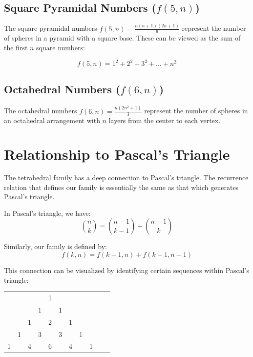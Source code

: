 \documentclass[12pt,a4paper]{article}
\begin{document}
\subsection{Square Pyramidal Numbers ($f(5,n)$)}

The square pyramidal numbers $f(5,n) = \frac{n(n+1)(2n+1)}{6}$ represent the number of spheres in a pyramid with a square base. These can be viewed as the sum of the first $n$ square numbers:

$$f(5,n) = 1^2 + 2^2 + 3^2 + \ldots + n^2$$

\subsection{Octahedral Numbers ($f(6,n)$)}

The octahedral numbers $f(6,n) = \frac{n(2n^2+1)}{3}$ represent the number of spheres in an octahedral arrangement with $n$ layers from the center to each vertex.

\section{Relationship to Pascal's Triangle}

The tetrahedral family has a deep connection to Pascal's triangle. The recurrence relation that defines our family is essentially the same as that which generates Pascal's triangle.

In Pascal's triangle, we have:
\begin{equation}
\binom{n}{k} = \binom{n-1}{k-1} + \binom{n-1}{k}
\end{equation}

Similarly, our family is defined by:
\begin{equation}
f(k,n) = f(k-1,n) + f(k-1,n-1)
\end{equation}

This connection can be visualized by identifying certain sequences within Pascal's triangle:

\begin{center}
\begin{tabular}{ccccccccccc}
& & & & 1 & & & & & \\
& & & 1 & & 1 & & & & \\
& & 1 & & 2 & & 1 & & & \\
& 1 & & 3 & & 3 & & 1 & & \\
1 & & 4 & & 6 & & 4 & & 1 & \\
\end{tabular}
\end{center}
\end{document}
